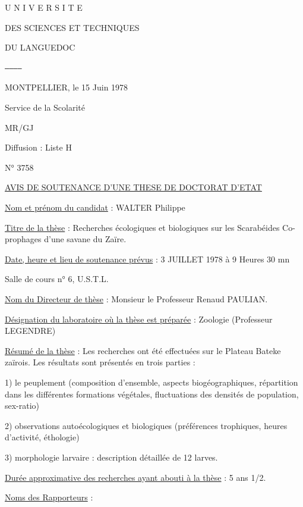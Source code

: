 U N I V E R S I T E

DES SCIENCES ET TECHNIQUES

DU LANGUEDOC

\texttt{------------}

MONTPELLIER, le 15 Juin 1978

Service de la Scolarité

MR/GJ

Diffusion : Liste H

N° 3758

\uline{AVIS DE SOUTENANCE D'UNE THESE DE DOCTORAT D'ETAT}

\uline{Nom et prénom du candidat} : WALTER Philippe

\uline{Titre de la thèse} : Recherches écologiques et biologiques sur les Scarabéides Co-\\
prophages d'une savane du Zaïre.

\uline{Date, heure et lieu de soutenance prévus} : 3 JUILLET 1978 à 9 Heures 30 mn

Salle de cours n° 6, U.S.T.L.

\uline{Nom du Directeur de thèse} : Monsieur le Professeur Renaud PAULIAN.

\uline{Désignation du laboratoire où la thèse est préparée} : Zoologie (Professeur LEGENDRE)

\uline{Résumé de la thèse} : Les recherches ont été effectuées sur le Plateau Bateke zaïrois.
Les résultats sont présentés en trois parties :

1) le peuplement (composition d'ensemble, aspects biogéographiques, répartition dans
les différentes formations végétales, fluctuations des densités de population,
sex-ratio)

2) observations autoécologiques et biologiques (préférences trophiques, heures
d'activité, éthologie)

3) morphologie larvaire : description détaillée de 12 larves.

\uline{Durée approximative des recherches ayant abouti à la thèse} : 5 ans 1/2.

\uline{Noms des Rapporteurs} :


